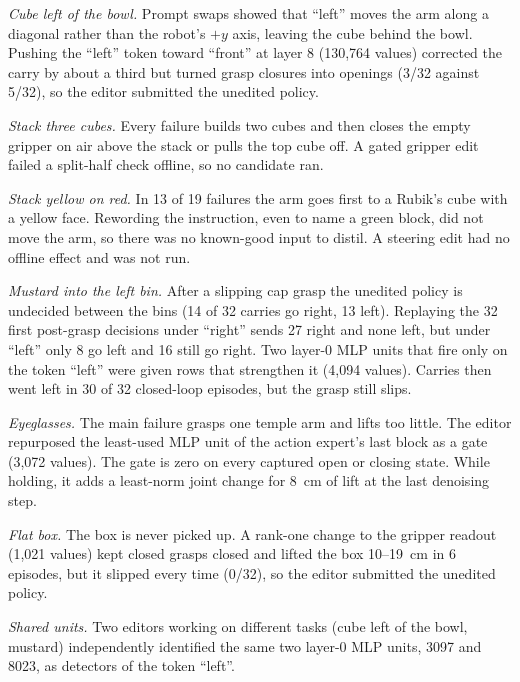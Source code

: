 \documentclass{article}
\begin{document}
\emph{Cube left of the bowl.} Prompt swaps showed that ``left'' moves the arm along a diagonal rather than the robot's $+y$ axis, leaving the cube behind the bowl. Pushing the ``left'' token toward ``front'' at layer 8 (130,764 values) corrected the carry by about a third but turned grasp closures into openings (3/32 against 5/32), so the editor submitted the unedited policy.

\emph{Stack three cubes.} Every failure builds two cubes and then closes the empty gripper on air above the stack or pulls the top cube off. A gated gripper edit failed a split-half check offline, so no candidate ran.

\emph{Stack yellow on red.} In 13 of 19 failures the arm goes first to a Rubik's cube with a yellow face. Rewording the instruction, even to name a green block, did not move the arm, so there was no known-good input to distil. A steering edit had no offline effect and was not run.

\emph{Mustard into the left bin.} After a slipping cap grasp the unedited policy is undecided between the bins (14 of 32 carries go right, 13 left). Replaying the 32 first post-grasp decisions under ``right'' sends 27 right and none left, but under ``left'' only 8 go left and 16 still go right. Two layer-0 MLP units that fire only on the token ``left'' were given rows that strengthen it (4,094 values). Carries then went left in 30 of 32 closed-loop episodes, but the grasp still slips.

\emph{Eyeglasses.} The main failure grasps one temple arm and lifts too little. The editor repurposed the least-used MLP unit of the action expert's last block as a gate (3,072 values). The gate is zero on every captured open or closing state. While holding, it adds a least-norm joint change for 8~cm of lift at the last denoising step.

\emph{Flat box.} The box is never picked up. A rank-one change to the gripper readout (1,021 values) kept closed grasps closed and lifted the box 10--19~cm in 6 episodes, but it slipped every time (0/32), so the editor submitted the unedited policy.

\emph{Shared units.} Two editors working on different tasks (cube left of the bowl, mustard) independently identified the same two layer-0 MLP units, 3097 and 8023, as detectors of the token ``left''.
\end{document}
